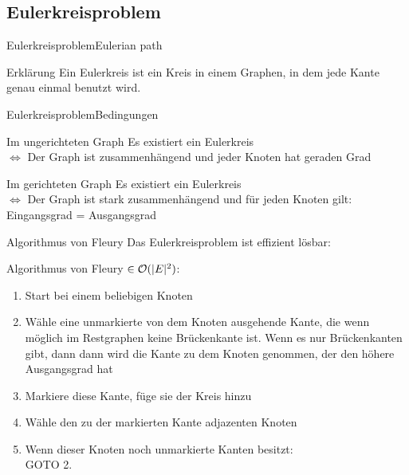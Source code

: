\subsection{Eulerkreisproblem}

\begin{frame}{Eulerkreisproblem}{Eulerian path}
	\begin{block}{Erklärung}
		Ein Eulerkreis ist ein Kreis in einem Graphen, in dem jede Kante genau einmal benutzt wird.
	\end{block}
\end{frame}

\begin{frame}{Eulerkreisproblem}{Bedingungen}
	\begin{block}{Im ungerichteten Graph}
		Es existiert ein Eulerkreis\\
		$\Leftrightarrow$ Der Graph ist zusammenhängend und jeder Knoten hat geraden Grad
	\end{block}
	
	\begin{block}{Im gerichteten Graph}
		Es existiert ein Eulerkreis\\
		$\Leftrightarrow$ Der Graph ist stark zusammenhängend und für jeden Knoten gilt: Eingangsgrad = Ausgangsgrad
	\end{block}	
\end{frame}

\begin{frame}{Algorithmus von Fleury}
	Das Eulerkreisproblem ist effizient lösbar:

	Algorithmus von Fleury $\in {\cal O}(|E|^2) $:
	
	\begin{enumerate}
		\item Start bei einem beliebigen Knoten
		\item Wähle eine unmarkierte von dem Knoten ausgehende Kante, die wenn möglich im Restgraphen keine Brückenkante ist. Wenn es nur Brückenkanten gibt, dann dann wird die Kante zu dem Knoten genommen, der den höhere Ausgangsgrad hat
		\item Markiere diese Kante, füge sie der Kreis hinzu
		\item Wähle den zu der markierten Kante adjazenten Knoten
		\item Wenn dieser Knoten noch unmarkierte Kanten besitzt: \\GOTO 2.
	\end{enumerate}
\end{frame}

